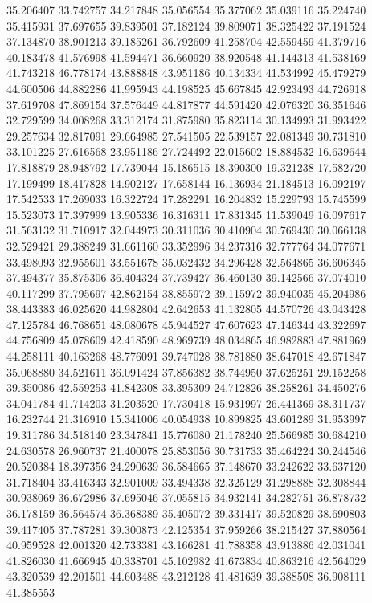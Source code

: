 35.206407
33.742757
34.217848
35.056554
35.377062
35.039116
35.224740
35.415931
37.697655
39.839501
37.182124
39.809071
38.325422
37.191524
37.134870
38.901213
39.185261
36.792609
41.258704
42.559459
41.379716
40.183478
41.576998
41.594471
36.660920
38.920548
41.144313
41.538169
41.743218
46.778174
43.888848
43.951186
40.134334
41.534992
45.479279
44.600506
44.882286
41.995943
44.198525
45.667845
42.923493
44.726918
37.619708
47.869154
37.576449
44.817877
44.591420
42.076320
36.351646
32.729599
34.008268
33.312174
31.875980
35.823114
30.134993
31.993422
29.257634
32.817091
29.664985
27.541505
22.539157
22.081349
30.731810
33.101225
27.616568
23.951186
27.724492
22.015602
18.884532
16.639644
17.818879
28.948792
17.739044
15.186515
18.390300
19.321238
17.582720
17.199499
18.417828
14.902127
17.658144
16.136934
21.184513
16.092197
17.542533
17.269033
16.322724
17.282291
16.204832
15.229793
15.745599
15.523073
17.397999
13.905336
16.316311
17.831345
11.539049
16.097617
31.563132
31.710917
32.044973
30.311036
30.410904
30.769430
30.066138
32.529421
29.388249
31.661160
33.352996
34.237316
32.777764
34.077671
33.498093
32.955601
33.551678
35.032432
34.296428
32.564865
36.606345
37.494377
35.875306
36.404324
37.739427
36.460130
39.142566
37.074010
40.117299
37.795697
42.862154
38.855972
39.115972
39.940035
45.204986
38.443383
46.025620
44.982804
42.642653
41.132805
44.570726
43.043428
47.125784
46.768651
48.080678
45.944527
47.607623
47.146344
43.322697
44.756809
45.078609
42.418590
48.969739
48.034865
46.982883
47.881969
44.258111
40.163268
48.776091
39.747028
38.781880
38.647018
42.671847
35.068880
34.521611
36.091424
37.856382
38.744950
37.625251
29.152258
39.350086
42.559253
41.842308
33.395309
24.712826
38.258261
34.450276
34.041784
41.714203
31.203520
17.730418
15.931997
26.441369
38.311737
16.232744
21.316910
15.341006
40.054938
10.899825
43.601289
31.953997
19.311786
34.518140
23.347841
15.776080
21.178240
25.566985
30.684210
24.630578
26.960737
21.400078
25.853056
30.731733
35.464224
30.244546
20.520384
18.397356
24.290639
36.584665
37.148670
33.242622
33.637120
31.718404
33.416343
32.901009
33.494338
32.325129
31.298888
32.308844
30.938069
36.672986
37.695046
37.055815
34.932141
34.282751
36.878732
36.178159
36.564574
36.368389
35.405072
39.331417
39.520829
38.690803
39.417405
37.787281
39.300873
42.125354
37.959266
38.215427
37.880564
40.959528
42.001320
42.733381
43.166281
41.788358
43.913886
42.031041
41.826030
41.666945
40.338701
45.102982
41.673834
40.863216
42.564029
43.320539
42.201501
44.603488
43.212128
41.481639
39.388508
36.908111
41.385553
